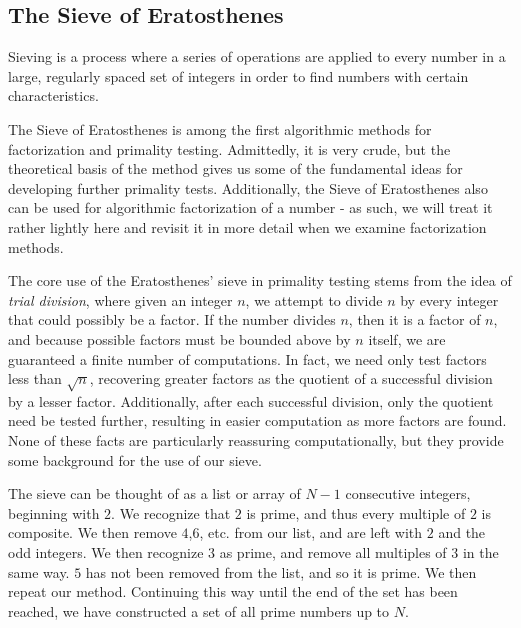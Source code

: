 \documentclass{article}
\begin{document}
\subsection*{ The Sieve of Eratosthenes }

\par Sieving is a process where a series of operations are applied to every number in a large, regularly spaced set of integers in order to find numbers with certain characteristics.

\par The Sieve of Eratosthenes is among the first algorithmic methods for factorization and primality testing. Admittedly, it is very crude, but the theoretical basis of the method gives us some of the fundamental ideas for developing further primality tests. Additionally, the Sieve of Eratosthenes also can be used for algorithmic factorization of a number - as such, we will treat it rather lightly here and revisit it in more detail when we examine factorization methods.

\par The core use of the Eratosthenes' sieve in primality testing stems from the idea of \textit{trial division}, where given an integer $n$, we attempt to divide $n$ by every integer that could possibly be a factor. If the number divides $n$, then it is a factor of $n$, and because possible factors must be bounded above by $n$ itself, we are guaranteed a finite number of computations. In fact, we need only test factors less than $\sqrt{n}$, recovering greater factors as the quotient of a successful division by a lesser factor. Additionally, after each successful division, only the quotient need be tested further, resulting in easier computation as more factors are found. None of these facts are particularly reassuring computationally, but they provide some background for the use of our sieve.

\par The sieve can be thought of as a list or array of $N - 1$ consecutive integers, beginning with $2$. We recognize that $2$ is prime, and thus every multiple of $2$ is composite. We then remove $4$,$6$, etc. from our list, and are left with $2$ and the odd integers. We then recognize $3$ as prime, and remove all multiples of $3$ in the same way. $5$ has not been removed from the list, and so it is prime. We then repeat our method. Continuing this way until the end of the set has been reached, we have constructed a set of all prime numbers up to $N$.
\end{document}
